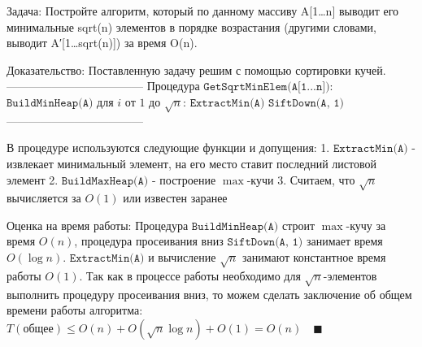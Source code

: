 Задача:
Постройте алгоритм, который по данному массиву A[1…n] выводит его минимальные sqrt(n) элементов в порядке возрастания (другими
словами, выводит A′[1…sqrt(n)]) за время O(n).

Доказательство:
Поставленную задачу решим с помощью сортировки кучей.
------------------------------------
Процедура $\texttt{GetSqrtMinElem(A[1...n])}$:
$\texttt{BuildMinHeap(A)}$
для $i$ от $1$ до $\sqrt{n}$:
    $\texttt{ExtractMin(A)}$
    $\texttt{SiftDown(A, 1)}$
------------------------------------

В процедуре используются следующие функции и допущения:
1. $\texttt{ExtractMin(A)}$ - извлекает минимальный элемент, на его место ставит последний листовой элемент
2. $\texttt{BuildMaxHeap(A)}$ - построение $\max$-кучи
3. Считаем, что $\sqrt{n}$ вычисляется за $O(1)$ или известен заранее

Оценка на время работы:
Процедура $\texttt{BuildMinHeap(A)}$ строит $\max$-кучу за время $O(n)$, процедура просеивания вниз $\texttt{SiftDown(A, 1)}$ занимает время $O(\log n)$. $\texttt{ExtractMin(A)}$ и вычисление $\sqrt{n}$ занимают константное время работы $O(1)$. Так как в процессе работы необходимо для $\sqrt{n}$-элементов выполнить процедуру просеивания вниз, то можем сделать заключение об общем времени работы алгоритма:
$T(\text{общее}) \leq O(n) + O(\sqrt{n}\log{n}) + O(1) = O(n) \quad\blacksquare$